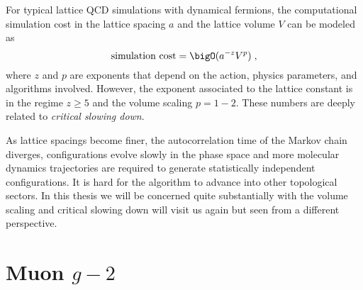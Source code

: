 For typical lattice QCD simulations with dynamical fermions, the computational simulation cost in the lattice spacing $a$ and the lattice volume $V$ can be modeled as~\cite{Luscher:1998pe}
\begin{equation}
\text{simulation cost} = \bigO( a^{-z} V^{p} )\;,
\end{equation}
where $z$ and $p$ are exponents that depend on the action, physics parameters, and algorithms involved.
However, the exponent associated to the lattice constant is in the regime $z \geq 5$ and the volume scaling $p = 1-2$.
These numbers are deeply related to \emph{critical slowing down}.

As lattice spacings become finer, the autocorrelation time of the Markov chain diverges, configurations evolve slowly in the phase space and more molecular dynamics trajectories are required to generate statistically independent configurations.
It is hard for the algorithm to advance into other topological sectors.
In this thesis we will be concerned quite substantially with the volume scaling and critical slowing down will visit us again but seen from a different perspective.




























\section{Muon $g-2$}
\label{sec:intro:gm2}


